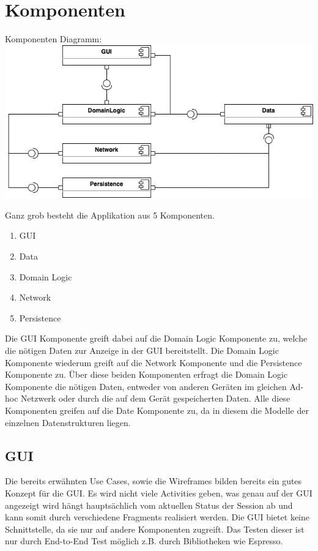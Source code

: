 \documentclass[11pt,a4paper,headsepline,footsepline,bibliography=totocnumbered]{article}
\begin{document}
\section{Komponenten}
Komponenten Diagramm:
    \newline
    \includegraphics[width=\textwidth]{pictures/component_diagram.drawio.png}

  \par
    Ganz grob besteht die Applikation aus 5 Komponenten.
    \begin{enumerate}
      \item GUI
      \item Data
      \item Domain Logic
      \item Network
      \item Persistence
    \end{enumerate}
    Die GUI Komponente greift dabei auf die Domain Logic Komponente zu, welche die nötigen Daten zur Anzeige in der GUI bereitstellt.
    Die Domain Logic Komponente wiederum greift auf die Network Komponente und die Persistence Komponente zu.
    Über diese beiden Komponenten erfragt die Domain Logic Komponente die nötigen Daten, entweder von anderen Geräten im gleichen Ad-hoc Netzwerk oder durch die auf dem Gerät gespeicherten Daten.
    Alle diese Komponenten greifen auf die Date Komponente zu, da in diesem die Modelle der einzelnen Datenstrukturen liegen.

  \subsection{GUI}
    \par
      Die bereits erwähnten Use Cases, sowie die Wireframes bilden bereits ein gutes Konzept für die GUI.
      Es wird nicht viele Activities geben, was genau auf der GUI angezeigt wird hängt hauptsächlich vom aktuellen Status der Session ab und kann somit durch verschiedene Fragments realisiert werden.
      Die GUI bietet keine Schnittstelle, da sie nur auf andere Komponenten zugreift.
      Das Testen dieser ist nur durch End-to-End Test möglich z.B. durch Bibliotheken wie Espresso.
\end{document}
